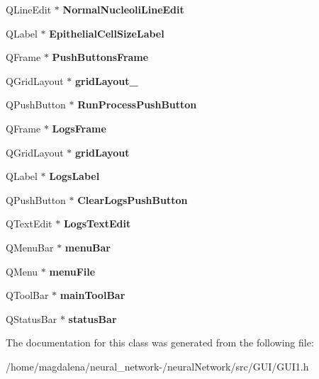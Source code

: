 \begin{DoxyCompactItemize}
Q\+Line\+Edit $\ast$ {\bfseries Normal\+Nucleoli\+Line\+Edit}
\item 
\mbox{\label{classUi__GUIClass_a57c6e1114411b0648fa6f64294f51b40}} 
Q\+Label $\ast$ {\bfseries Epithelial\+Cell\+Size\+Label}
\item 
\mbox{\label{classUi__GUIClass_a79ef34f1e52a3a2b793f5c26ab512228}} 
Q\+Frame $\ast$ {\bfseries Push\+Buttons\+Frame}
\item 
\mbox{\label{classUi__GUIClass_a35d8d50ebb378cc4ec46f6554f5f5dcf}} 
Q\+Grid\+Layout $\ast$ {\bfseries grid\+Layout\+\_}
\item 
\mbox{\label{classUi__GUIClass_a2f598ce2e9d7d620fd35138348becced}} 
Q\+Push\+Button $\ast$ {\bfseries Run\+Process\+Push\+Button}
\item 
\mbox{\label{classUi__GUIClass_a28c34718ca00c228e5827e49ddbd385e}} 
Q\+Frame $\ast$ {\bfseries Logs\+Frame}
\item 
\mbox{\label{classUi__GUIClass_a9f3baf74e29941ecaaf1a65aa17ed55f}} 
Q\+Grid\+Layout $\ast$ {\bfseries grid\+Layout}
\item 
\mbox{\label{classUi__GUIClass_aa4aab8f8a82e885c79f370fd10f0a228}} 
Q\+Label $\ast$ {\bfseries Logs\+Label}
\item 
\mbox{\label{classUi__GUIClass_a227235f6ed633f00900eccf82beaed52}} 
Q\+Push\+Button $\ast$ {\bfseries Clear\+Logs\+Push\+Button}
\item 
\mbox{\label{classUi__GUIClass_a1e5223eadc39d1b2ad2c095ef8ec2b1a}} 
Q\+Text\+Edit $\ast$ {\bfseries Logs\+Text\+Edit}
\item 
\mbox{\label{classUi__GUIClass_aba670b52e0772bea7de163eb4316648e}} 
Q\+Menu\+Bar $\ast$ {\bfseries menu\+Bar}
\item 
\mbox{\label{classUi__GUIClass_ab990cb0e59c3184f5542e5c5564c8cf2}} 
Q\+Menu $\ast$ {\bfseries menu\+File}
\item 
\mbox{\label{classUi__GUIClass_ae48af47c2edd5057a1836e5b872d8784}} 
Q\+Tool\+Bar $\ast$ {\bfseries main\+Tool\+Bar}
\item 
\mbox{\label{classUi__GUIClass_a54aefdd0673d1031847778a560fc14c4}} 
Q\+Status\+Bar $\ast$ {\bfseries status\+Bar}
\end{DoxyCompactItemize}


The documentation for this class was generated from the following file\+:\begin{DoxyCompactItemize}
\item 
/home/magdalena/neural\+\_\+network-\//neural\+Network/src/\+G\+U\+I/G\+U\+I1.\+h\end{DoxyCompactItemize}

